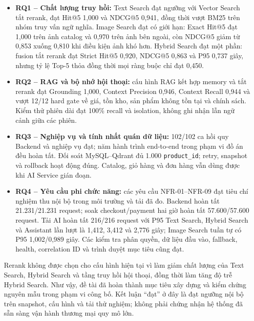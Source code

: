 \begin{itemize}
    \item \textbf{RQ1 -- Chất lượng truy hồi:} Text Search đạt ngưỡng với Vector Search tắt rerank, đạt Hit@5 1,000 và NDCG@5 0,941, đồng thời vượt BM25 trên nhóm truy vấn ngữ nghĩa. Image Search đạt có giới hạn: Exact Hit@5 đạt 1,000 trên ảnh catalog và 0,970 trên ảnh bên ngoài, còn NDCG@5 giảm từ 0,853 xuống 0,810 khi điều kiện ảnh khó hơn. Hybrid Search đạt một phần: fusion tắt rerank đạt Strict Hit@5 0,920, NDCG@5 0,863 và P95 0,737 giây, nhưng tỷ lệ Top-5 thỏa đồng thời mọi ràng buộc chỉ đạt 0,450.

    \item \textbf{RQ2 -- RAG và bộ nhớ hội thoại:} cấu hình RAG kết hợp memory và tắt rerank đạt Grounding 1,000, Context Precision 0,946, Context Recall 0,944 và vượt 12/12 hard gate về giá, tồn kho, sản phẩm không tồn tại và chính sách. Kiểm thử phiên dài đạt 100\% recall và isolation, không ghi nhận lẫn ngữ cảnh giữa các phiên.

    \item \textbf{RQ3 -- Nghiệp vụ và tính nhất quán dữ liệu:} 102/102 ca hồi quy Backend và nghiệp vụ đạt; năm hành trình end-to-end trong phạm vi đồ án đều hoàn tất. Đối soát MySQL--Qdrant đủ 1.000 \texttt{product\_id}; retry, snapshot và rollback hoạt động đúng. Catalog, giỏ hàng và đơn hàng vẫn dùng được khi AI Service gián đoạn.

    \item \textbf{RQ4 -- Yêu cầu phi chức năng:} các yêu cầu NFR-01--NFR-09 đạt tiêu chí nghiệm thu nội bộ trong môi trường và tải đã đo. Backend hoàn tất 21.231/21.231 request; soak checkout/payment hai giờ hoàn tất 57.600/57.600 request. Tải AI hoàn tất 216/216 request với P95 Text Search, Hybrid Search và Assistant lần lượt là 1,412, 3,412 và 2,776 giây; Image Search tuần tự có P95 1,002/0,989 giây. Các kiểm tra phân quyền, dữ liệu đầu vào, fallback, health, correlation ID và trình duyệt mục tiêu cũng đạt.
\end{itemize}

Rerank không được chọn cho cấu hình hiện tại vì làm giảm chất lượng của Text Search, Hybrid Search và tầng truy hồi hội thoại, đồng thời làm tăng độ trễ Hybrid Search. Như vậy, đề tài đã hoàn thành mục tiêu xây dựng và kiểm chứng nguyên mẫu trong phạm vi công bố. Kết luận \enquote{đạt} ở đây là đạt ngưỡng nội bộ trên snapshot, cấu hình và tải thử nghiệm; không phải chứng nhận hệ thống đã sẵn sàng vận hành thương mại quy mô lớn.

